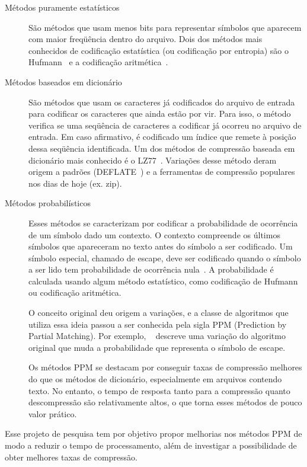 \documentclass[a4paper,12pt,oneside]{article}
\let\cite\citep
\begin{document}
\begin{description}

\item[Métodos puramente estatísticos]
São métodos que  usam menos bits para representar símbolos que aparecem com maior freqüência dentro do arquivo. Dois dos métodos mais conhecidos de codificação estatística (ou codificação por entropia) são o Hufmann~\cite{huffman1952method} e a codificação aritmética~\cite{witten1987arithmetic}. 

\item[Métodos baseados em dicionário]
São métodos que usam os caracteres já codificados do arquivo de entrada para codificar os caracteres que ainda estão por vir. Para isso, o método verifica se uma seqüência de caracteres a codificar já ocorreu no arquivo de entrada. Em caso afirmativo, é codificado um índice que remete à posição dessa seqüência identificada. Um dos métodos de compressão baseada em dicionário mais conhecido é o LZ77~\cite{ziv1977universal}. Variações desse método deram origem a padrões (DEFLATE~\cite{salomon2004data}) e a ferramentas de compressão populares nos dias de hoje (ex. zip).


\item[Métodos probabilísticos]
Esses métodos se caracterizam por codificar a probabilidade de ocorrência de um símbolo dado um contexto. O contexto compreende os últimos símbolos que apareceram no texto antes do símbolo a ser codificado. Um símbolo especial, chamado de escape, deve ser codificado quando o símbolo a ser lido tem probabilidade de ocorrência nula~\cite{moffat1990implementing}. A probabilidade é calculada usando algum método estatístico, como codificação de Hufmann ou codificação aritmética. 

O conceito original deu origem a variações, e a classe de algoritmos que utiliza essa ideia passou a ser conhecida pela sigla PPM (Prediction by Partial Matching). Por exemplo, ~\citep{cleary1984data} descreve uma variação do algoritmo original que muda a probabilidade que representa o símbolo de escape.

Os métodos PPM se destacam por conseguir  taxas de compressão melhores do que os métodos de dicionário, especialmente em arquivos contendo texto. No entanto, o tempo de resposta tanto para a compressão quanto descompressão são relativamente altos, o que torna esses métodos de pouco valor prático.

\end{description}

Esse projeto de pesquisa tem por objetivo propor melhorias nos métodos PPM de modo a reduzir o tempo de processamento, além de investigar a possibilidade de obter melhores taxas de compressão. 
\end{document}
